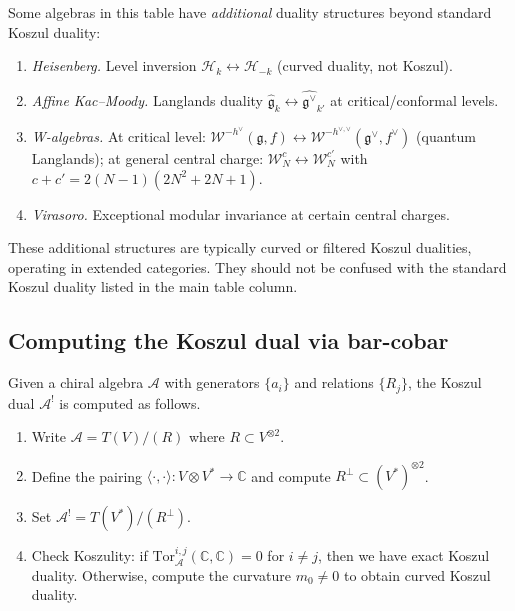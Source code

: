 \begin{remark}\label{rem:additional-dualities}
Some algebras in this table have \emph{additional} duality structures beyond standard Koszul duality:

\begin{enumerate}
\item \emph{Heisenberg.} Level inversion $\mathcal{H}_k \leftrightarrow \mathcal{H}_{-k}$ (curved duality, not Koszul).

\item \emph{Affine Kac--Moody.} Langlands duality $\widehat{\mathfrak{g}}_k \leftrightarrow \widehat{\mathfrak{g}^\vee}_{k'}$ at critical/conformal levels.

\item \emph{W-algebras.} At critical level: $\mathcal{W}^{-h^\vee}(\mathfrak{g}, f) \leftrightarrow \mathcal{W}^{-h^{\vee,\vee}}(\mathfrak{g}^\vee, f^\vee)$ (quantum Langlands); at general central charge: $\mathcal{W}_N^c \leftrightarrow \mathcal{W}_N^{c'}$ with $c + c' = 2(N-1)(2N^2+2N+1)$.

\item \emph{Virasoro.} Exceptional modular invariance at certain central charges.
\end{enumerate}

These additional structures are typically curved or filtered Koszul dualities, operating in extended categories. They should not be confused with the standard Koszul duality listed in the main table column.
\end{remark}

\subsection{Computing the Koszul dual via bar-cobar}

\begin{remark}[Procedure]\label{rem:koszul-dual-procedure}
Given a chiral algebra $\mathcal{A}$ with generators $\{a_i\}$ and relations $\{R_j\}$, the Koszul dual $\mathcal{A}^!$ is computed as follows.
\begin{enumerate}
\item Write $\mathcal{A} = T(V)/(R)$ where $R \subset V^{\otimes 2}$.
\item Define the pairing $\langle \cdot, \cdot \rangle\colon V \otimes V^* \to \mathbb{C}$ and compute $R^\perp \subset (V^*)^{\otimes 2}$.
\item Set $\mathcal{A}^! = T(V^*)/(R^\perp)$.
\item Check Koszulity: if $\mathrm{Tor}_{\mathcal{A}}^{i,j}(\mathbb{C}, \mathbb{C}) = 0$ for $i \neq j$, then we have exact Koszul duality. Otherwise, compute the curvature $m_0 \neq 0$ to obtain curved Koszul duality.
\end{enumerate}
\end{remark}

